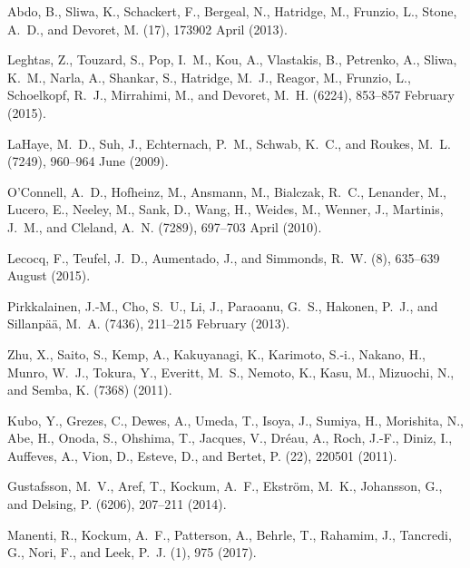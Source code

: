 \documentclass[a4paper, amsfonts, amssymb, amsmath, reprint,showkeys,nofootinbib,superscriptaddress]{revtex4-2}
\begin{document}
\begin{thebibliography}{10}
	Abdo, B., Sliwa, K., Schackert, F., Bergeal, N., Hatridge, M., Frunzio, L.,
	Stone, A.~D., and Devoret, M.
	(17), 173902 April  (2013).
	
	Leghtas, Z., Touzard, S., Pop, I.~M., Kou, A., Vlastakis, B., Petrenko, A.,
	Sliwa, K.~M., Narla, A., Shankar, S., Hatridge, M.~J., Reagor, M., Frunzio,
	L., Schoelkopf, R.~J., Mirrahimi, M., and Devoret, M.~H.
	(6224), 853--857 February  (2015).
	
	LaHaye, M.~D., Suh, J., Echternach, P.~M., Schwab, K.~C., and Roukes, M.~L.
	(7249), 960--964 June  (2009).
	
	O’Connell, A.~D., Hofheinz, M., Ansmann, M., Bialczak, R.~C., Lenander, M.,
	Lucero, E., Neeley, M., Sank, D., Wang, H., Weides, M., Wenner, J., Martinis,
	J.~M., and Cleland, A.~N.
	(7289), 697--703 April  (2010).
	
	Lecocq, F., Teufel, J.~D., Aumentado, J., and Simmonds, R.~W.
	(8), 635--639 August  (2015).
	
	Pirkkalainen, J.-M., Cho, S.~U., Li, J., Paraoanu, G.~S., Hakonen, P.~J., and
	Sillanpää, M.~A.
	(7436), 211--215 February  (2013).
	
	Zhu, X., Saito, S., Kemp, A., Kakuyanagi, K., Karimoto, S.-i., Nakano, H.,
	Munro, W.~J., Tokura, Y., Everitt, M.~S., Nemoto, K., Kasu, M., Mizuochi, N.,
	and Semba, K.
	(7368) (2011).
	
	Kubo, Y., Grezes, C., Dewes, A., Umeda, T., Isoya, J., Sumiya, H., Morishita,
	N., Abe, H., Onoda, S., Ohshima, T., Jacques, V., Dréau, A., Roch, J.-F.,
	Diniz, I., Auffeves, A., Vion, D., Esteve, D., and Bertet, P.
	(22), 220501 (2011).
	
	Gustafsson, M.~V., Aref, T., Kockum, A.~F., Ekström, M.~K., Johansson, G., and
	Delsing, P.
	(6206), 207--211 (2014).
	
	Manenti, R., Kockum, A.~F., Patterson, A., Behrle, T., Rahamim, J., Tancredi,
	G., Nori, F., and Leek, P.~J.
	(1), 975 (2017).
	

\end{thebibliography}
\end{document}
